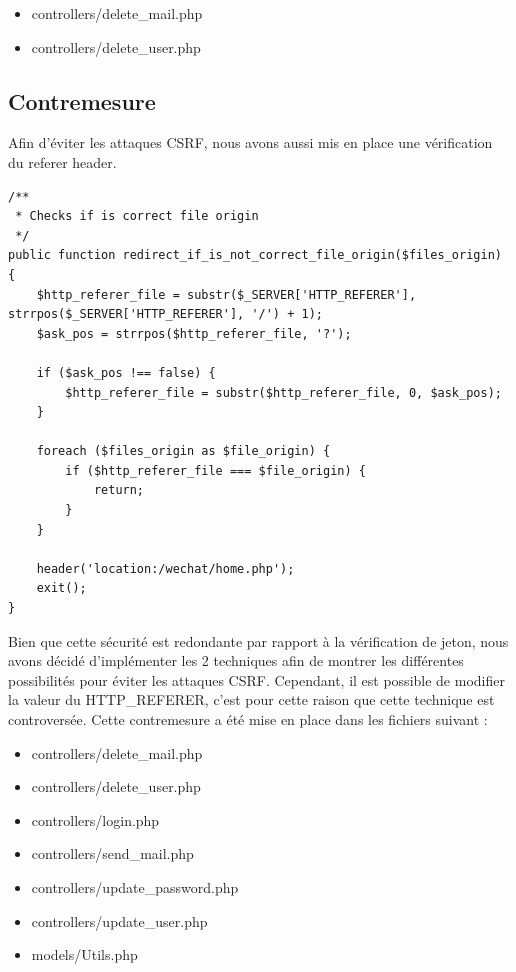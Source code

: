 \documentclass[12pt]{article}
\begin{document}
\begin{itemize}
\item controllers/delete\_mail.php
\item controllers/delete\_user.php
\end{itemize}

\newpage
\subsection{Contremesure}\label{c4_2}

Afin d'éviter les attaques CSRF, nous avons aussi mis en place une vérification du referer header. 

\begin{lstlisting}[style=JAVA]
/**
 * Checks if is correct file origin
 */
public function redirect_if_is_not_correct_file_origin($files_origin) {
    $http_referer_file = substr($_SERVER['HTTP_REFERER'], strrpos($_SERVER['HTTP_REFERER'], '/') + 1);
    $ask_pos = strrpos($http_referer_file, '?');

    if ($ask_pos !== false) {
        $http_referer_file = substr($http_referer_file, 0, $ask_pos);
    }
    
    foreach ($files_origin as $file_origin) {
        if ($http_referer_file === $file_origin) {
            return;
        }
    }

    header('location:/wechat/home.php');
    exit();
}
\end{lstlisting}

Bien que cette sécurité est redondante par rapport à la vérification de jeton, nous avons décidé d'implémenter les 2 techniques afin de montrer les différentes possibilités pour éviter les attaques CSRF. Cependant, il est possible de modifier la valeur du HTTP\_REFERER, c'est pour cette raison que cette technique est controversée.
Cette contremesure a été mise en place dans les fichiers suivant :

\begin{itemize}
\item controllers/delete\_mail.php
\item controllers/delete\_user.php
\item controllers/login.php
\item controllers/send\_mail.php
\item controllers/update\_password.php
\item controllers/update\_user.php
\item models/Utils.php
\end{itemize}
\end{document}
